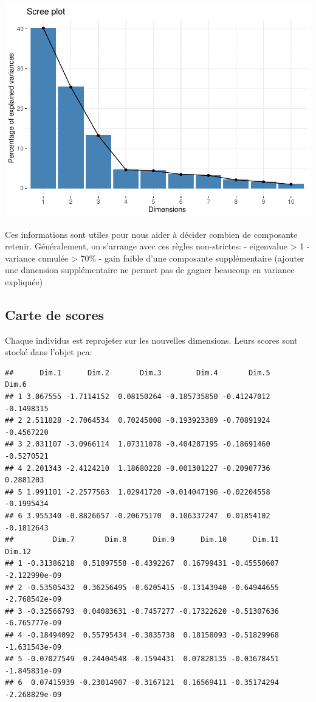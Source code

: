 \documentclass[
]{book}
\newenvironment{Shaded}{\begin{snugshade}}{\end{snugshade}}
\newcommand{\FunctionTok}[1]{\textcolor[rgb]{0.13,0.29,0.53}{\textbf{#1}}}
\newcommand{\NormalTok}[1]{#1}
\newcommand{\SpecialCharTok}[1]{\textcolor[rgb]{0.81,0.36,0.00}{\textbf{#1}}}
\begin{document}
\includegraphics{bookdown-demo_files/figure-latex/unnamed-chunk-71-1.pdf}

Ces informations sont utiles pour nous aider à décider combien de composante retenir. Généralement, on s'arrange avec ces règles non-strictes: - eigenvalue \textgreater{} 1 - variance cumulée \textgreater{} 70\% - gain faible d'une composante supplémentaire (ajouter une dimension supplémentaire ne permet pas de gagner beaucoup en variance expliquée)

\hypertarget{carte-de-scores}{%
\subsection{Carte de scores}\label{carte-de-scores}}

Chaque individus est reprojeter sur les nouvelles dimensions. Leurs scores sont stocké dans l'objet pca:

\begin{Shaded}
\end{Shaded}

\begin{verbatim}
##      Dim.1      Dim.2       Dim.3        Dim.4       Dim.5      Dim.6
## 1 3.067555 -1.7114152  0.08150264 -0.185735850 -0.41247012 -0.1498315
## 2 2.511828 -2.7064534  0.70245008 -0.193923389 -0.70891924 -0.4567220
## 3 2.031107 -3.0966114  1.07311078 -0.404287195 -0.18691460 -0.5270521
## 4 2.201343 -2.4124210  1.18680228 -0.001301227 -0.20907736  0.2881203
## 5 1.991101 -2.2577563  1.02941720 -0.014047196 -0.02204558 -0.1995434
## 6 3.955340 -0.8826657 -0.20675170  0.106337247  0.01854102 -0.1812643
##         Dim.7       Dim.8      Dim.9      Dim.10      Dim.11        Dim.12
## 1 -0.31386218  0.51897558 -0.4392267  0.16799431 -0.45550607 -2.122990e-09
## 2 -0.53505432  0.36256495 -0.6205415 -0.13143940 -0.64944655 -2.768542e-09
## 3 -0.32566793  0.04083631 -0.7457277 -0.17322620 -0.51307636 -6.765777e-09
## 4 -0.18494092  0.55795434 -0.3835738  0.18158093 -0.51829968 -1.631543e-09
## 5 -0.07027549  0.24404548 -0.1594431  0.07828135 -0.03678451 -1.845831e-09
## 6  0.07415939 -0.23014907 -0.3167121  0.16569411 -0.35174294 -2.268829e-09
\end{verbatim}
\end{document}
